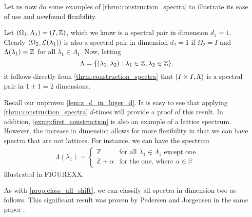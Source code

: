 \documentclass[../thesis.tex]{subfiles}
\begin{document}
Let us now do some examples of \cref{thrm:construction_spectra} to illustrate its ease of use and newfound flexibility. 
\begin{example}\label{exmp:first_construction}
    Let $(\Omega_1,\Lambda_1)=(I, \mathbb{Z})$, which we know is a spectral pair in dimension $d_1=1$. Clearly $(\Omega_2,\mathcal{L}(\lambda_1))$ is also a spectral pair in dimension $d_2=1$ if $\Omega_2=I$ and $\Lambda(\lambda_1) = \mathbb{Z}$ for all $\lambda_1 \in \Lambda_1$. Now, letting 
    \begin{equation}\label{eq:first_construction}
        \Lambda  = \{(\lambda_1,\lambda_2): \lambda_1 \in \mathbb{Z}, \lambda_2 \in \mathbb{Z} \},
    \end{equation}
    it follows directly from \cref{thrm:construction_spectra} that $(I \times I, \Lambda)$ is a spectral pair in $1+1=2$ dimensions.
\end{example}

Recall our unproven \cref{lem:z_d_in_higer_d}. It is easy to see that applying \cref{thrm:construction_spectra} $d$-times will provide a proof of this result. In addition, \cref{exmp:first_construction} is also an example of a lattice spectrum. %
However, the increase in dimension allows for more flexibility in that we can have spectra that are not lattices. For instance, we can have the spectrum 
\begin{align*}
    \Lambda(\lambda_1) = \begin{cases}        
        \mathbb{Z} & \text{for all } \lambda_1 \in \Lambda_1 \text{ except one}\\        
        \mathbb{Z}+\alpha & \text{for the one, where } \alpha \in \mathbb{R}   
    \end{cases}
\end{align*}
illustrated in FIGUREXX. 



As with \cref{prop:class_all_shift}, we can classify all spectra in dimension two as follows. This significant result was proven by Pedersen and Jorgensen in the same paper \cite{jorgensenSpectralPairsCartesian2001}. 
\end{document}
